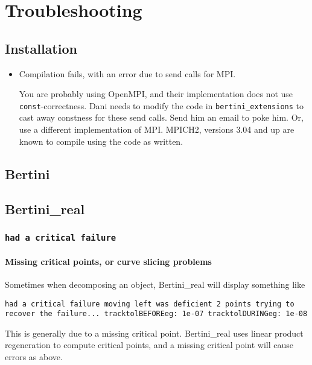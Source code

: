 
\section{Troubleshooting}

	\subsection{Installation}

	\begin{itemize}
	\item Compilation fails, with an error due to send calls for MPI.  

	You are probably using OpenMPI, and their implementation does not use {\tt const}-correctness.  Dani needs to modify the code in {\tt bertini\_extensions} to cast away constness for these send calls.  Send him an email to poke him.  Or, use a different implementation of MPI.  MPICH2, versions 3.04 and up are known to compile using the code as written. 
	\end{itemize}

\subsection{Bertini}

\subsection{Bertini\_real}


\subsubsection{\tt had a critical failure}

\paragraph{Missing critical points, or curve slicing problems}

Sometimes when decomposing an object, Bertini\_real will display something like

{\tt	had a critical failure
 moving left was deficient 2 points
trying to recover the failure...
tracktolBEFOREeg: 1e-07 tracktolDURINGeg: 1e-08
}

This is generally due to a missing critical point.  Bertini\_real uses linear product regeneration to compute critical points, and a missing critical point will cause errors as above.  


